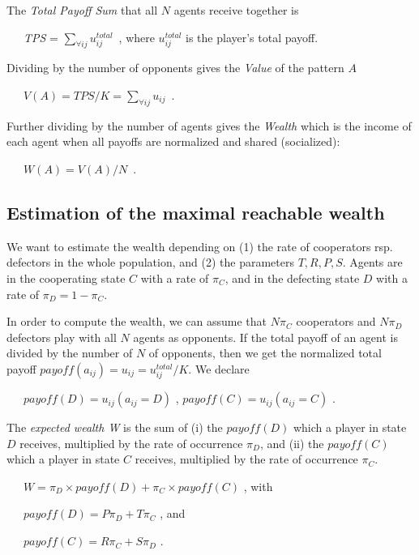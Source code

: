 \documentclass[10pt,a4paper]{article}  %
\begin{document}

The \textit{Total Payoff Sum}  that all $N$ agents receive together is

~~~\textit{TPS} = $\sum_{\forall ij}{u}_{ij}^{total}$~, where ${u}_{ij}^{total}$ is the player's total payoff. 

Dividing by the number of opponents gives the \textit{Value} of the pattern $A$

~~~$V(A) = TPS/K = \sum_{\forall ij}{u}_{ij}$~.

Further dividing by the number of agents gives the \textit{Wealth}
which is the income of each agent when all payoffs are normalized 
and shared (socialized):

~~~$W(A) = V(A)/N$~.


\subsection{Estimation of the maximal reachable wealth}

We want to estimate the wealth depending on (1) the rate of cooperators rsp. defectors in the
whole population, and (2) the parameters $T,R,P,S.$
Agents are in the cooperating state $C$ with a rate of $\pi_C$,
and in the defecting state $D$ with a rate of $\pi_D=1-\pi_C$.

In order to compute the wealth, we can assume that
$N \pi_C$ cooperators and $N \pi_D$ defectors
play with all $N$ agents as opponents. 
If the total payoff of an agent is divided by the number of $N$ of opponents,
then we get the normalized total payoff 
$\textit{payoff}(a_{ij})=u_{ij}=u_{ij}^{total}/K$. 
We declare

~~~$\textit{payoff}(D) = u_{ij}(a_{ij}=D)$ ,  $\textit{payoff}(C) = u_{ij}(a_{ij}=C)$ .

The \textit{expected wealth W} is the sum of
(i) the  $\textit{payoff}(D)$ which a player in state $D$ receives, multiplied by the rate of occurrence $\pi_D$, and 
(ii) the  $\textit{payoff}(C)$ which a player in state $C$ receives, multiplied by the rate of occurrence $\pi_C$.


~~~$W= \pi_D \times \textit{payoff}(D) + \pi_C \times \textit{payoff}(C)$ , with

~~~$\textit{payoff}(D)= P \pi_D + T \pi_C$ , and

~~~$\textit{payoff}(C)= R \pi_C + S \pi_D$ .
\end{document}
